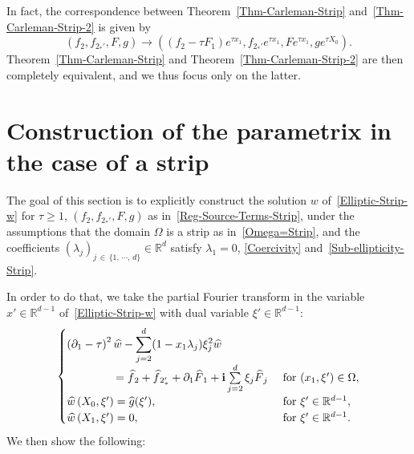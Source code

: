 \documentclass[10pt]{amsart}
\theoremstyle{definition}\newtheorem{defi}[theo]{Definition}\newtheorem{rema}[theo]{Remark}\newtheorem{exam}[theo]{Example}\newtheorem{exem}[theo]{Example}\newtheorem{nota}[theo]{Notation}
\newcommand*\R{\mathbb{R}}
\renewcommand{\i}{\mathbf{i}}
\newcommand*\ds{\displaystyle}
\renewcommand{\geq}{\geqslant}
\renewcommand{\hat}{\widehat}
\let\oldhat\hat
\renewcommand*{\hat}[1]{\mathchoice{\widehat{#1}}{\widehat{#1}}{\oldhat{#1}}{\oldhat{#1}}}
\begin{document}
In fact, the correspondence between Theorem~\ref{Thm-Carleman-Strip} and~\ref{Thm-Carleman-Strip-2} is given by
\[
(f_2, f_{2_*'},F,g)
\to
\left((f_2 - \tau F_1) e^{\tau x_1}, f_{2_*'} e^{\tau x_1}, F e^{\tau x_1}, g e^{\tau X_0}
\right).
\]
Theorem~\ref{Thm-Carleman-Strip} and Theorem~\ref{Thm-Carleman-Strip-2} are then completely equivalent, and we thus focus only on the latter.

\section{Construction of the parametrix in the case of a strip}\label{Sec-parametrix-Strip}

The goal of this section is to explicitly construct the solution $w$ of~\eqref{Elliptic-Strip-w} for $\tau \geq 1$, $(f_2, f_{2_*'},F,g)$ as in~\eqref{Reg-Source-Terms-Strip}, under the assumptions that the domain $\Omega$ is a strip as in~\eqref{Omega=Strip}, and the coefficients $(\lambda_j)_{j\, \in\, \{1,\,\cdots,\,d\}} \in \R^d$ satisfy $\lambda_1 = 0$, \eqref{Coercivity} and~\eqref{Sub-ellipticity-Strip}.

In order to do that, we take the partial Fourier transform in the variable $x' \in \R^{d-1}$ of~\eqref{Elliptic-Strip-w} with dual variable $\xi' \in \R^{d-1}$:
\begin{equation}\label{Elliptic-Strip-w-Fourier}
\begin{cases}
\ds \left(\partial_1 - \tau\right)^2 \hat w- \sum_{j=2}^{d} (1 - x_{1}\lambda_j) \xi_j^{2} \hat w 
\\
\mkern78mu= \hat f_2 + \hat f_{2_*'} + \partial_1 \hat F_1 + \i \sum\limits_{j = 2}^d \xi_j \hat F_j & \text { for } (x_1, \xi') \in \Omega,\\
\hat w\left(X_{0}, \xi'\right)=\hat g (\xi '), &\text{ for } \xi' \in \R^{d-1},
\\
\hat w\left(X_{1}, \xi'\right)= 0, &\text{ for } \xi' \in \R^{d-1}.
\end{cases}
\end{equation}
We then show the following:
\end{document}
